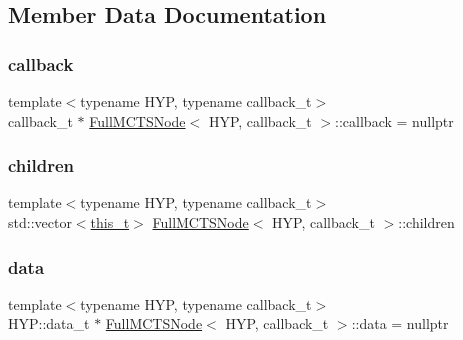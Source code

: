 \subsection{Member Data Documentation}
\mbox{\label{class_full_m_c_t_s_node_a7e8ecdad10651454729d7eeac57fb045}} 
\subsubsection{\texorpdfstring{callback}{callback}}
{\footnotesize\ttfamily template$<$typename H\+YP, typename callback\+\_\+t$>$ \\
callback\+\_\+t $\ast$ \hyperlink{class_full_m_c_t_s_node}{Full\+M\+C\+T\+S\+Node}$<$ H\+YP, callback\+\_\+t $>$\+::callback = nullptr\hspace{0.3cm}{\ttfamily [static]}}

\mbox{\label{class_full_m_c_t_s_node_ac9bdca86a2e0f0030952e00f5ba0b1b2}} 
\subsubsection{\texorpdfstring{children}{children}}
{\footnotesize\ttfamily template$<$typename H\+YP, typename callback\+\_\+t$>$ \\
std\+::vector$<$\hyperlink{class_full_m_c_t_s_node_afcc6a60f2d45fd1d6c4bd5f4998b147d}{this\+\_\+t}$>$ \hyperlink{class_full_m_c_t_s_node}{Full\+M\+C\+T\+S\+Node}$<$ H\+YP, callback\+\_\+t $>$\+::children}

\mbox{\label{class_full_m_c_t_s_node_ab326b6830adc9d68d8cb7d3cc6e4f37f}} 
\subsubsection{\texorpdfstring{data}{data}}
{\footnotesize\ttfamily template$<$typename H\+YP, typename callback\+\_\+t$>$ \\
H\+Y\+P\+::data\+\_\+t $\ast$ \hyperlink{class_full_m_c_t_s_node}{Full\+M\+C\+T\+S\+Node}$<$ H\+YP, callback\+\_\+t $>$\+::data = nullptr\hspace{0.3cm}{\ttfamily [static]}}

